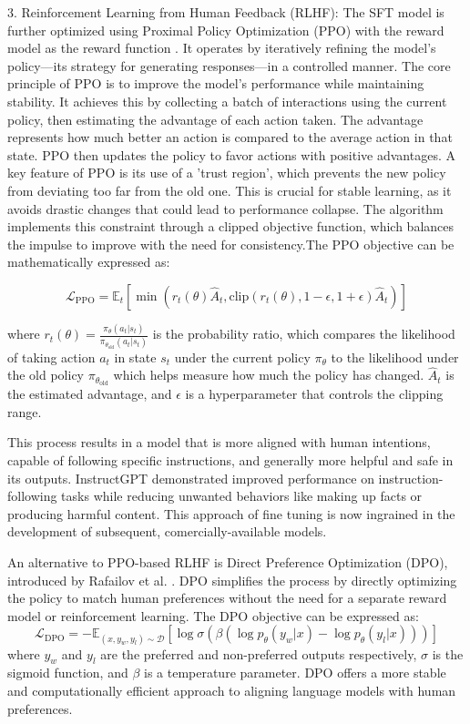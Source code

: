 \documentclass[a4paper, oneside]{discothesis}
\begin{document}
3. Reinforcement Learning from Human Feedback (RLHF): The SFT model is further optimized using Proximal Policy Optimization (PPO) 
with the reward model as the reward function \cite{schulman2017proximal}. It operates by iteratively refining the model's policy—its strategy for generating responses—in a controlled manner.
The core principle of PPO is to improve the model's performance while maintaining stability. It achieves this by collecting a batch of interactions using the current policy, then estimating the advantage of each action taken. 
The advantage represents how much better an action is compared to the average action in that state. 
PPO then updates the policy to favor actions with positive advantages. A key feature of PPO is its use of a 'trust region', which prevents the new policy from deviating too far from the old one. 
This is crucial for stable learning, as it avoids drastic changes that could lead to performance collapse. 
The algorithm implements this constraint through a clipped objective function, which balances the impulse to improve with the need for consistency.The PPO objective can be mathematically expressed as:

   \[\mathcal{L}_{\text{PPO}} = \mathbb{E}_t[\min(r_t(\theta)\hat{A}_t, \text{clip}(r_t(\theta), 1-\epsilon, 1+\epsilon)\hat{A}_t)]\]

   where $r_t(\theta) = \frac{\pi_\theta(a_t|s_t)}{\pi_{\theta_\text{old}}(a_t|s_t)}$ is the probability ratio, which compares the likelihood of taking action $a_t$ in state $s_t$ under the current policy $\pi_\theta$ to the likelihood under the old policy $\pi_{\theta_\text{old}}$ which helps measure how much the policy has changed.
  $\hat{A}_t$ is the estimated advantage, and $\epsilon$ is a hyperparameter that controls the clipping range.

This process results in a model that is more aligned with human intentions, capable of following specific instructions, and generally more helpful and safe in its outputs. 
InstructGPT demonstrated improved performance on instruction-following tasks while reducing unwanted behaviors like making up facts or producing harmful content.
This approach of fine tuning is now ingrained in the development of subsequent, comercially-available models.

An alternative to PPO-based RLHF is Direct Preference Optimization (DPO), introduced by Rafailov et al. \cite{rafailov2023direct}. 
DPO simplifies the process by directly optimizing the policy to match human preferences without the need for a separate reward model or reinforcement learning. 
The DPO objective can be expressed as:
\[\mathcal{L}_{\text{DPO}} = -\mathbb{E}_{(x,y_w,y_l)\sim \mathcal{D}}[\log \sigma(\beta(\log p_\theta(y_w|x) - \log p_\theta(y_l|x)))]\]
where $y_w$ and $y_l$ are the preferred and non-preferred outputs respectively, $\sigma$ is the sigmoid function, and $\beta$ is a temperature parameter. DPO offers a more stable and computationally efficient approach to aligning language models with human preferences.
\end{document}
